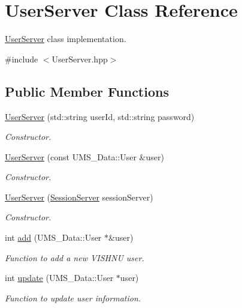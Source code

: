 \hypertarget{classUserServer}{
\section{UserServer Class Reference}
\label{classUserServer}
}


\hyperlink{classUserServer}{UserServer} class implementation.  




{\ttfamily \#include $<$UserServer.hpp$>$}

\subsection*{Public Member Functions}
\begin{DoxyCompactItemize}
\item 
\hyperlink{classUserServer_a64281da3f0076b3273bf9e83123211a2}{UserServer} (std::string userId, std::string password)
\begin{DoxyCompactList}\small\item\em Constructor. \item\end{DoxyCompactList}\item 
\hyperlink{classUserServer_a5b19188b031a3ab5fc40cabc2a097b1d}{UserServer} (const UMS\_\-Data::User \&user)
\begin{DoxyCompactList}\small\item\em Constructor. \item\end{DoxyCompactList}\item 
\hyperlink{classUserServer_a2a8ac1a46357a5fb7d10ea741b534b3d}{UserServer} (\hyperlink{classSessionServer}{SessionServer} sessionServer)
\begin{DoxyCompactList}\small\item\em Constructor. \item\end{DoxyCompactList}\item 
int \hyperlink{classUserServer_a05207b09729ba075b82abe57908ccff1}{add} (UMS\_\-Data::User $\ast$\&user)
\begin{DoxyCompactList}\small\item\em Function to add a new VISHNU user. \item\end{DoxyCompactList}\item 
int \hyperlink{classUserServer_a6653ef686b1622001ca6b211da5d9f3b}{update} (UMS\_\-Data::User $\ast$user)
\begin{DoxyCompactList}\small\item\em Function to update user information. \item\end{DoxyCompactList}\item 

\end{DoxyCompactItemize}
